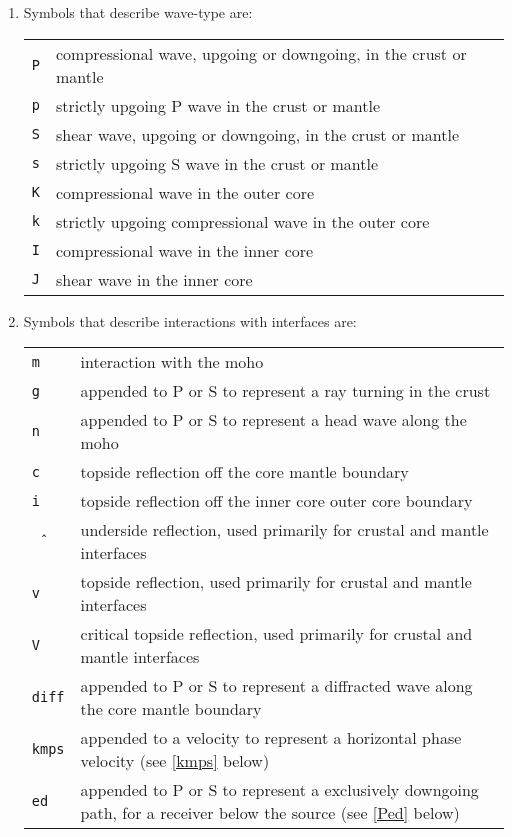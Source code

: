 \begin{enumerate}
\item Symbols that describe wave-type are:

\begin{tabular}{lp{5.0in}}
\texttt{P} & compressional wave, upgoing or downgoing, in the crust or mantle \\
\texttt{p} & strictly upgoing P wave in the crust or mantle \\
\texttt{S} & shear wave, upgoing or downgoing, in the crust or mantle \\
\texttt{s} & strictly upgoing S wave in the crust or mantle \\
\texttt{K} & compressional wave in the outer core \\
\texttt{k} & strictly upgoing compressional wave in the outer core \\
\texttt{I} & compressional wave in the inner core \\
\texttt{J} & shear wave in the inner core \\
\end{tabular}

\item Symbols that describe interactions with interfaces are:

\begin{tabular}{lp{5.0in}}
\texttt{m} & interaction with the moho \\
\texttt{g} & appended to P or S to represent a ray turning in the crust \\
\texttt{n} & appended to P or S to represent a head wave along the moho \\
\texttt{c} & topside reflection off the core mantle boundary \\
\texttt{i} & topside reflection off the inner core outer core boundary \\
\texttt{\^\,} & underside reflection, used primarily for crustal and mantle interfaces \\
\texttt{v} & topside reflection, used primarily for crustal and mantle interfaces \\
\texttt{V} & critical topside reflection, used primarily for crustal and mantle interfaces \\
\texttt{diff} & appended to P or S to represent a diffracted wave along the core mantle boundary \\
\texttt{kmps} & appended to a velocity to represent a horizontal phase velocity (see
\ref{kmps} below)\\
\texttt{ed} & appended to P or S to represent a exclusively downgoing path, for a receiver below the source (see
\ref{Ped} below)\\
\end{tabular}


\end{enumerate}
